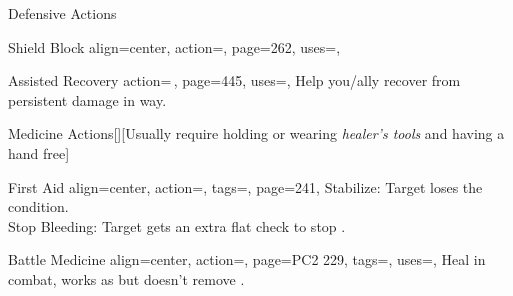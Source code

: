 \begin{PageBackLandscape}
\begin{TablesHalf}{\backTableHeight}
\begin{Table}{Defensive Actions}
\begin{entry}{Shield Block}{%
                align=center,
                action=,
                page=262,
                uses=\Feat,
            }
            \end{entry}
            \breakLine
            \begin{entry}{Assisted Recovery}{%
                action={\,\sffamily{}},
                page=445,
                uses=,
            }
                Help you/ally recover from persistent damage in  way. \hfill
                 \hfill
            \end{entry}
        \end{Table}
        \TableSpace
        \begin{Table}{Medicine Actions}[][\quad Usually require holding or wearing \textit{healer's tools} and having
        a hand
        free]
            \begin{entry}{First Aid}{%
                align=center,
                action=,
                tags=\Manipulate,
                page=241,
            }%
                \setlength{\tabcolsep}{9pt}%
                \Medicine[][before=Recovery,val=+5]\edash Stabilize:
                Target loses the \Dying condition. \hfill
                \\
                \Medicine[][before=Effect] \hspace{0.2ex}\edash\hspace{0.2ex}Stop Bleeding:
                Target gets an extra \DC[10] flat check to stop \Bleeding.\hfill
            \end{entry}
            \begin{entry}{Battle Medicine}{%
                align=center,
                action=,
                page=PC2 229,
                tags=\Manipulate,
                uses=\Medicine\Feat,
            }
                Heal in combat, works as  but doesn't remove \Wounded.\hfill
                \\\hfill
                \T\DC[15] \quad\quad
                \E\DC[20] \quad\quad
                \M\DC[30]  \quad\quad
                \Le\DC[40] \hfill {}
            \end{entry}

\end{Table}
\end{TablesHalf}
\end{PageBackLandscape}
